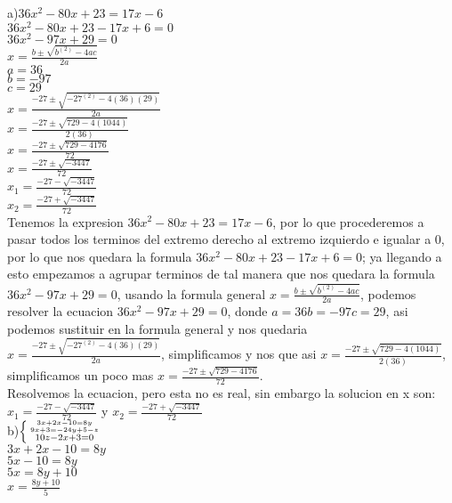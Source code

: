 \documentclass{report}%
\begin{document}
\\
{\small
a)$36x^2-80x+23=17x-6$\\
$36x^2-80x+23-17x+6=0$\\
$36x^2-97x+29=0$\\
$x=\frac{b \pm \sqrt{b^(2)-4ac}}{2a}$\\
$a=36$\\
$b=-97$\\
$c=29$\\
$x=\frac{-27 \pm \sqrt{-27^(2)-4(36)(29)}}{2a}$\\
$x=\frac{-27 \pm \sqrt{729-4(1044)}}{2(36)}$\\
$x=\frac{-27 \pm \sqrt{729-4176}}{72}$\\
$x=\frac{-27 \pm \sqrt{-3447}}{72}$\\
$x_{1}=\frac{-27 - \sqrt{-3447}}{72}$\\
$x_{2}=\frac{-27 + \sqrt{-3447}}{72}$\\
{\small Tenemos la expresion $36x^2-80x+23=17x-6$, por lo que procederemos a pasar todos los terminos del extremo derecho al extremo izquierdo e igualar a 0, por lo que nos quedara la formula $36x^2-80x+23-17x+6=0$; ya llegando a esto empezamos a agrupar terminos de tal manera que nos quedara la formula $36x^2-97x+29=0$, usando la formula general $x=\frac{b \pm \sqrt{b^(2)-4ac}}{2a}$, podemos resolver la ecuacion $36x^2-97x+29=0$, donde $a= 36 b=-97 c=29$, asi podemos sustituir en la formula general y nos quedaria $x=\frac{-27 \pm \sqrt{-27^(2)-4(36)(29)}}{2a}$, simplificamos y nos que asi $x=\frac{-27 \pm \sqrt{729-4(1044)}}{2(36)}$, simplificamos un poco mas $x=\frac{-27 \pm \sqrt{729-4176}}{72}$.\\
Resolvemos la ecuacion, pero esta no es real, sin embargo la solucion en x son:\\ $x_{1}=\frac{-27 - \sqrt{-3447}}{72}$  y $x_{2}=\frac{-27 + \sqrt{-3447}}{72}$\ } \\

b)$\left\{
    {{
      3x + 2x - 10 = 8y
      \atop
      9x + 3 = -24y + 5 - z
   } }\atop
      10z - 2x + 3 = 0
    \right.$\\
{\small
$3x+2x-10 = 8y$\\
$5x-10= 8y$\\
$5x= 8y+10$\\
$x=\frac{8y+10}{5}$\\

}}
\end{document}
